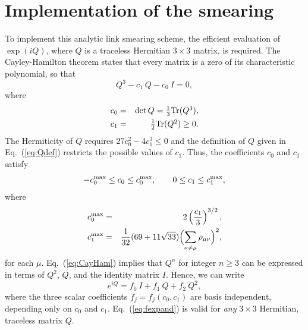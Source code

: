 \section{Implementation of the smearing}
\label{sec:implement}

To implement this analytic link smearing scheme, the efficient evaluation
of $\exp( i Q)$, where $Q$ is a traceless Hermitian $3\times 3$ matrix,
is required. The Cayley-Hamilton theorem states that every matrix is a zero
of its characteristic polynomial, so that
\begin{equation}
  Q^3 - c_1\ Q - c_0\ I = 0,
\label{eq:CayHam}
\end{equation}
where
\begin{eqnarray}
 c_0 &=&  \det Q=\textstyle\frac{1}{3}\mbox{Tr}(Q^3),\\
 c_1 &=& \textstyle\frac{1}{2} \mbox{Tr}(Q^2)\geq 0.
\end{eqnarray}
The Hermiticity of $Q$ requires $27c_0^2-4c_1^3\leq 0$  and
the definition of $Q$ given in Eq.~(\ref{eq:Qdef}) restricts the possible
values of $c_1$.  Thus, the coefficients $c_0$ and $c_1$ satisfy
\begin{equation}
 -c_0^{\rm max}\leq c_0 \leq c_0^{\rm max},\qquad
0 \leq c_1 \leq c_1^{\rm max},
\end{equation}
where
\begin{eqnarray}
 c_0^{\rm max}&=&2\left(\frac{c_1}{3}\right)^{3/2},\\
  c_1^{\rm max} &=& \frac{1}{32}
  (69+11\sqrt{33})\Bigl(\displaystyle\sum_{\nu\neq\mu}
\rho_{\mu\nu}\Bigr)^2,
\end{eqnarray}
for each $\mu$.  Eq.~(\ref{eq:CayHam}) implies that $Q^n$ for integer
$n\geq 3$ can be expressed in terms of $Q^2$, $Q$, and the identity
matrix $I$.  Hence, we can write
\begin{equation}
 e^{i Q} = f_0\ I + f_1\ Q + f_2\ Q^2,
\label{eq:fexpand}
\end{equation}
where the three scalar coefficients $f_j=f_j(c_0,c_1)$ are
basis independent, depending only on $c_0$ and $c_1$.  Eq.~(\ref{eq:fexpand})
is valid for {\em any} $3\times 3$ Hermitian, traceless matrix $Q$.

